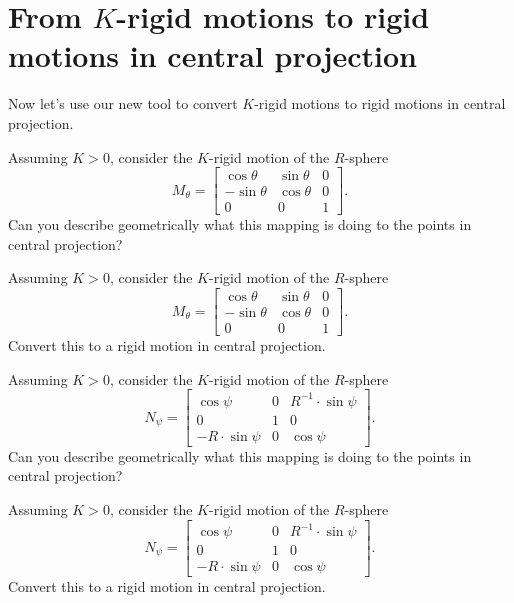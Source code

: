\documentclass{ximera}
\begin{document}
\section{From $K$-rigid motions to rigid motions in central projection}

Now let's use our new tool to convert $K$-rigid motions to rigid motions in central projection. 



\begin{problem}
  Assuming $K > 0$, consider the $K$-rigid motion of the $R$-sphere
  \[
  M_\theta=
  \begin{bmatrix}
    \cos\theta & \sin\theta & 0\\
    -\sin\theta & \cos\theta & 0\\
    0 & 0 & 1
  \end{bmatrix}.
  \]
  Can you describe geometrically what this mapping is doing to the
  points in central projection?
\end{problem}


\begin{problem}
  Assuming $K > 0$, consider the $K$-rigid motion of the $R$-sphere
  \[
  M_\theta=
  \begin{bmatrix}
    \cos\theta & \sin\theta & 0\\
    -\sin\theta & \cos\theta & 0\\
    0 & 0 & 1
  \end{bmatrix}.
  \]
  Convert this to a rigid motion in central projection.
\end{problem}


\begin{problem}
  Assuming $K > 0$, consider the $K$-rigid motion of the $R$-sphere
  \[
  N_\psi=
  \begin{bmatrix}
    \cos\psi & 0 & R^{-1}\cdot\sin\psi\\
    0 & 1 & 0\\
    -R\cdot\sin\psi & 0 & \cos\psi
  \end{bmatrix}.
  \]
Can you describe geometrically what this mapping is doing to the
points in central projection?  
\end{problem}


\begin{problem}
  Assuming $K > 0$, consider the $K$-rigid motion of the $R$-sphere
  \[
  N_\psi=
  \begin{bmatrix}
    \cos\psi & 0 & R^{-1}\cdot\sin\psi\\
    0 & 1 & 0\\
    -R\cdot\sin\psi & 0 & \cos\psi
  \end{bmatrix}.
  \]
  Convert this to a rigid motion in central projection.
\end{problem}
\end{document}
